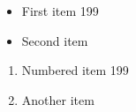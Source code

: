 \documentclass{article}
\begin{document}
\begin{itemize}
\item First item 199
\item Second item
\end{itemize}
\begin{enumerate}
\item Numbered item 199
\item Another item
\end{enumerate}
\end{document}

